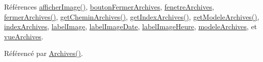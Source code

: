 Références \hyperlink{class_archives_a0e12a12774643d96831be4daba73976e}{afficher\+Image()}, \hyperlink{class_archives_a598e607e203aee9386f85d55f20d8fda}{bouton\+Fermer\+Archives}, \hyperlink{class_archives_ad7c8209637b01f638b64530020d18b8e}{fenetre\+Archives}, \hyperlink{class_archives_a0001d8b6a783f1f424965832e89a1f6f}{fermer\+Archives()}, \hyperlink{class_archives_a65dfbaba0123e6530b03bfb70e614c90}{get\+Chemin\+Archives()}, \hyperlink{class_archives_a3df83e6dd301afe331d7e75bd1b84a57}{get\+Index\+Archives()}, \hyperlink{class_archives_ab5a55ac2e810cfdec3ce19af14087ceb}{get\+Modele\+Archives()}, \hyperlink{class_archives_a31cba52f3979585ee5e2b9390d21322b}{index\+Archives}, \hyperlink{class_archives_af311679d957985d956a4ee5ad28a5988}{label\+Image}, \hyperlink{class_archives_accb81477f1edca94691ae630ddc1f3f9}{label\+Image\+Date}, \hyperlink{class_archives_ab678af24ff4c67b8791ab52e998c79cb}{label\+Image\+Heure}, \hyperlink{class_archives_a61376e4ec330aea053fede230a1bc786}{modele\+Archives}, et \hyperlink{class_archives_a28fe566dcac396079d064460b17293b9}{vue\+Archives}.



Référencé par \hyperlink{class_archives_ac30edd63c3f6c0df583bab7b9b9b4c76}{Archives()}.


